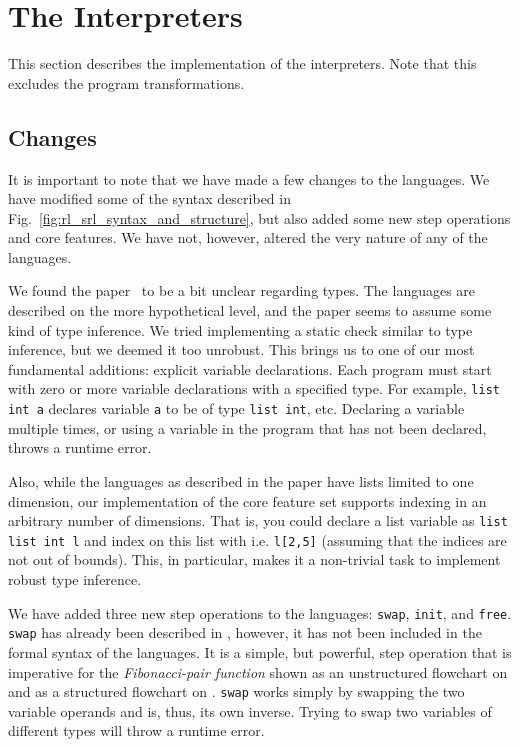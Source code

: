 
\section{The Interpreters}

This section describes the implementation of the interpreters. Note that this excludes the program transformations.

\subsection{Changes}\label{sec:changes}

It is important to note that we have made a few changes to the languages. We have modified some of the syntax described in Fig.~\ref{fig:rl_srl_syntax_and_structure}, but also added some new step operations and core features. We have not, however, altered the very nature of any of the languages.

We found the paper~\cite{REV} to be a bit unclear regarding types. The languages are described on the more hypothetical level, and the paper seems to assume some kind of type inference. We tried implementing a static check similar to type inference, but we deemed it too unrobust. This brings us to one of our most fundamental additions: explicit variable declarations. Each program must start with zero or more variable declarations with a specified type. For example, \texttt{list int a} declares variable \texttt{a} to be of type \texttt{list int}, etc. Declaring a variable multiple times, or using a variable in the program that has not been declared, throws a runtime error.

Also, while the languages as described in the paper have lists limited to one dimension, our implementation of the core feature set supports indexing in an arbitrary number of dimensions. That is, you could declare a list variable as \texttt{list list int l} and index on this list with i.e. \texttt{l[2,5]} (assuming that the indices are not out of bounds). This, in particular, makes it a non-trivial task to implement robust type inference.

We have added three new step operations to the languages: \texttt{swap}, \texttt{init}, and \texttt{free}. \texttt{swap} has already been described in \cite[p.~99]{REV}, however, it has not been included in the formal syntax of the languages. It is a simple, but powerful, step operation that is imperative for the \textit{Fibonacci-pair function} shown as an unstructured flowchart on \cite[p.~99]{REV} and as a structured flowchart on \cite[p.~93]{REV}. \texttt{swap} works simply by swapping the two variable operands and is, thus, its own inverse. Trying to swap two variables of different types will throw a runtime error.

